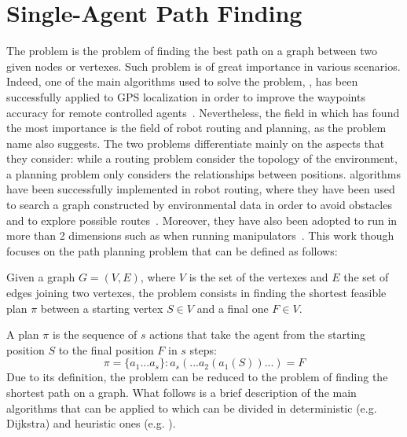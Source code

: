 \section{Single-Agent Path Finding}
\label{sec:SAPF}
The  problem is the problem of finding the best path on a graph 
between two given nodes or vertexes. Such problem is of great importance in 
various scenarios. Indeed, one of the main algorithms used to solve the 
 problem, \astar, has been successfully applied to GPS localization
in order to improve the waypoints accuracy for remote controlled 
agents~\cite{astar_gps}. Nevertheless, the field in which  has found
the most importance is the field of robot routing and planning, as the problem 
name also suggests. The two problems differentiate mainly on the aspects that 
they consider: while a routing problem consider the topology of the 
environment, a planning problem only considers the relationships between 
positions. 
 algorithms have been successfully implemented in robot routing, 
where they have been used to search a graph constructed by environmental data
in order to avoid obstacles and to explore possible 
routes~\cite{robot_routing}. Moreover, they have also been adopted to run in 
more than 2 dimensions such as when running 
manipulators~\cite{robot_mani}. \newline
This work though focuses on the path planning problem that can be defined as 
follows:
\begin{definition}
Given a graph $G = (V,E)$, where $V$ is the set of the vertexes and $E$ the set
of edges joining two vertexes, the  problem consists in finding the
shortest feasible plan $\pi$ between a starting vertex $S\in V$ and a final one 
$F\in V$. 
\end{definition}
A plan $\pi$ is the sequence of $s$ actions that take the agent from the 
starting position $S$ to the final position $F$ in $s$ steps:
\[ \pi=\{a_1...a_s\} : a_s(...a_2(a_1(S))...)=F \]
Due to its definition, the  problem can be reduced to the problem of
finding the shortest path on a graph. What follows is a brief description of
the main algorithms that can be applied to  which can be divided in
deterministic (e.g. Dijkstra) and heuristic ones (e.g. \astar).
%
%
